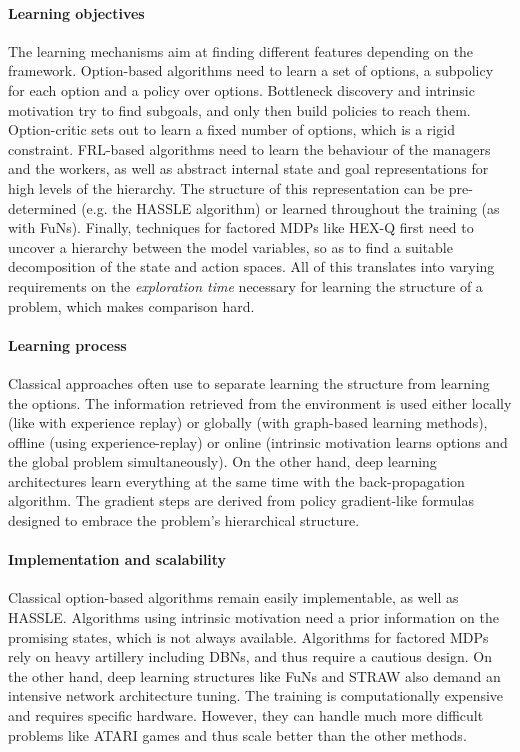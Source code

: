 \documentclass{article}
\begin{document}
\paragraph{Learning objectives}
The learning mechanisms aim at finding different features depending on the framework. Option-based algorithms need to learn a set of options, a subpolicy for each option and a policy over options. Bottleneck discovery and intrinsic motivation try to find subgoals, and only then build policies to reach them. Option-critic sets out to learn a fixed number of options, which is a rigid constraint. FRL-based algorithms need to learn the behaviour of the managers and the workers, as well as abstract internal state and goal representations for high levels of the hierarchy. The structure of this representation can be pre-determined (e.g. the HASSLE algorithm) or learned throughout the training (as with FuNs). Finally, techniques for factored MDPs like HEX-Q first need to uncover a hierarchy between the model variables, so as to find a suitable decomposition of the state and action spaces. All of this translates into varying requirements on the \textit{exploration time} necessary for learning the structure of a problem, which makes comparison hard.

\paragraph{Learning process} Classical approaches often use to separate learning the structure from learning the options. The information retrieved from the environment is used either locally (like with experience replay) or globally (with graph-based learning methods), offline (using experience-replay) or online (intrinsic motivation learns options and the global problem simultaneously). On the other hand, deep learning architectures learn everything at the same time with the back-propagation algorithm. The gradient steps are derived from policy gradient-like formulas designed to embrace the problem's hierarchical structure.

\paragraph{Implementation and scalability} Classical option-based algorithms remain easily implementable, as well as HASSLE. Algorithms using intrinsic motivation need a prior information on the promising states, which is not always available. Algorithms for factored MDPs rely on heavy artillery including DBNs, and thus require a cautious design. On the other hand, deep learning structures like FuNs and STRAW also demand an intensive network architecture tuning. The training is computationally expensive and requires specific hardware. However, they can handle much more difficult problems like ATARI games and thus scale better than the other methods.
\end{document}
